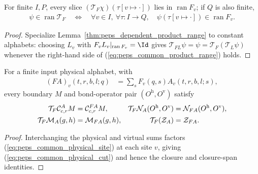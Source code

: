 \begin{lemma}%
    \label{thm:peps_four_cut_common_product_range}
    \leanok
    For finite $I,P$, every slice $(\mathcal T_F\chi)(\tau[v\mapsto\cdot])$ lies in
    $\operatorname{ran}F_v$; if $Q$ is also finite,
    \begin{align}
        \psi\in\operatorname{ran}\mathcal T_F
        \quad\Longleftrightarrow\quad
        \forall v\in I,\ \forall\tau:I\to Q,\quad
        \psi(\tau[v\mapsto\cdot])\in\operatorname{ran}F_v.
        \label{eq:peps_common_product_range}
    \end{align}
\end{lemma}
\begin{proof}\leanok
    Specialize Lemma~\ref{thm:peps_dependent_product_range} to constant
    alphabets: choosing $L_v$ with $F_vL_v|_{\operatorname{ran}F_v}=\Id$ gives
    $\mathcal T_{FL}\psi=\psi=\mathcal T_F(\mathcal T_L\psi)$ whenever the
    right-hand side of (\ref{eq:peps_common_product_range}) holds.
\end{proof}

\begin{lemma}%
    \label{thm:peps_four_cut_common_physical_contraction}
    \leanok
    For a finite input physical alphabet, with
    \begin{align}
        (FA)_v(t,r,b,l;q) & =\sum_sF_v(q,s)A_v(t,r,b,l;s),
        \label{eq:peps_common_physical_site}
    \end{align}
    every boundary $M$ and bond-operator pair $(O^{\mathrm h},O^{\mathrm v})$ satisfy
    \begin{align}
        \mathcal T_F\mathcal C^A_{c,r}M
                                      & =\mathcal C^{FA}_{c,r}M,                       &
        \mathcal T_F\mathcal N_A(O^{\mathrm h},O^{\mathrm v})
                                      & =\mathcal N_{FA}(O^{\mathrm h},O^{\mathrm v}),
        \label{eq:peps_common_physical_cut}                                              \\
        \mathcal T_F\mathcal M_A(g,h) & =\mathcal M_{FA}(g,h),                         &
        \mathcal T_F(\mathcal Z_A)    & =\mathcal Z_{FA}.
        \notag
    \end{align}
\end{lemma}
\begin{proof}\leanok
    Interchanging the physical and virtual sums factors
    (\ref{eq:peps_common_physical_site}) at each site $v$, giving
    (\ref{eq:peps_common_physical_cut}) and hence the closure and closure-span
    identities.
\end{proof}

